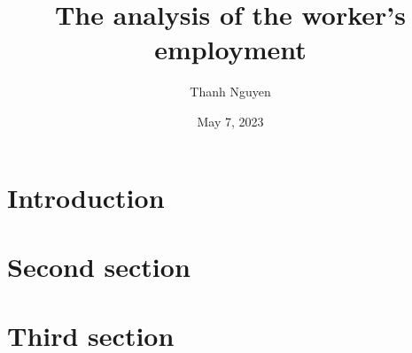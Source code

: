 \documentclass[12pt, a4paper]{article}
\title{The analysis of the worker's employment}
\author{Thanh Nguyen}
\date{May 7, 2023}
\begin{document}
\maketitle


\section{Introduction}
\blindtext

\section{Second section}
\blindtext[2]

\section{Third section}
\blindtext
\end{document}

